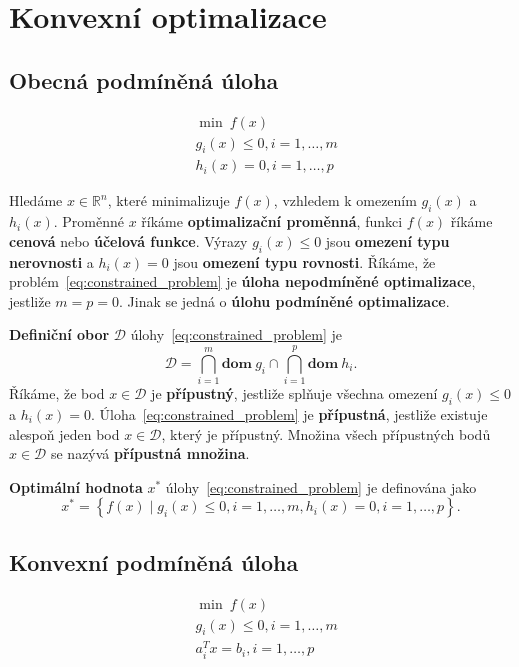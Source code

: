 \chapter{Konvexní optimalizace}

\section{Obecná podmíněná úloha}

\begin{equation}\label{eq:constrained_problem}
    \begin{split}
        &\min\ f(x) \\
        &g_i(x) \leq 0, i = 1, \dots, m \\
        &h_i(x) = 0, i = 1, \dots, p
    \end{split}
\end{equation}

Hledáme $x \in \mathbb{R}^n$, které minimalizuje $f(x)$, vzhledem k omezením $g_i(x)$ a $h_i(x)$. Proměnné $x$ říkáme \textbf{optimalizační proměnná}, funkci $f(x)$ říkáme \textbf{cenová} nebo \textbf{účelová funkce}. Výrazy $g_i(x) \leq 0$ jsou \textbf{omezení typu nerovnosti} a $h_i(x) = 0$ jsou \textbf{omezení typu rovnosti}. Říkáme, že problém~\ref{eq:constrained_problem} je \textbf{úloha nepodmíněné optimalizace}, jestliže $m = p = 0$. Jinak se jedná o \textbf{úlohu podmíněné optimalizace}.

\textbf{Definiční obor} $\mathcal{D}$ úlohy~\ref{eq:constrained_problem} je
$$
    \mathcal{D} = \bigcap_{i=1}^m \textbf{dom}\ g_i \cap \bigcap_{i=1}^p \textbf{dom}\ h_i.
$$
Říkáme, že bod $x \in \mathcal{D}$ je \textbf{přípustný}, jestliže splňuje všechna omezení $g_i(x) \leq 0$ a $h_i(x) = 0$. Úloha~\ref{eq:constrained_problem} je \textbf{přípustná}, jestliže existuje alespoň jeden bod $x \in \mathcal{D}$, který je přípustný. Množina všech přípustných bodů $x \in \mathcal{D}$ se nazývá \textbf{přípustná množina}.

\textbf{Optimální hodnota} $x^*$ úlohy~\ref{eq:constrained_problem} je definována jako
$$
    x^* = \left\{ f(x) \mid g_i(x) \leq 0, i = 1, \dots, m, h_i(x) = 0, i = 1, \dots, p \right\}.
$$

\section{Konvexní podmíněná úloha}

\begin{equation}\label{eq:convex_problem}
    \begin{split}
        &\min\ f(x) \\
        &g_i(x) \leq 0, i = 1, \dots, m \\
        &a_i^Tx = b_i, i = 1, \dots, p
    \end{split}
\end{equation}

